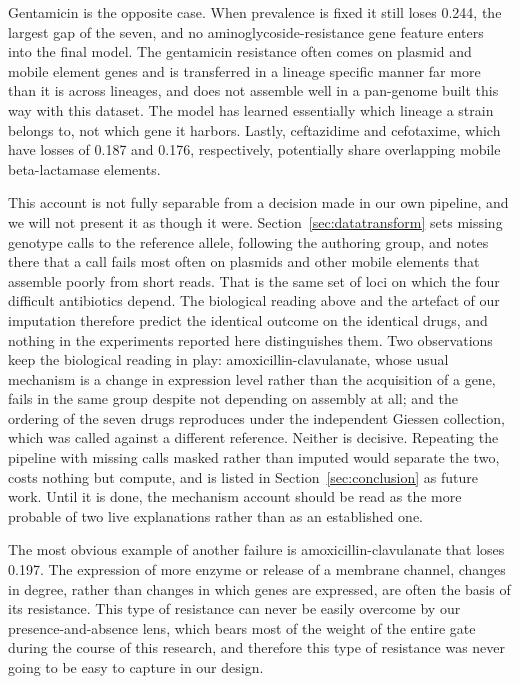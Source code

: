 \documentclass[journal]{IEEEtran}
\begin{document}
Gentamicin is the opposite case. When prevalence is fixed it still loses 0.244, the
largest gap of the seven, and no aminoglycoside-resistance gene feature enters into
the final model. The gentamicin resistance often comes on plasmid and mobile element
genes and is transferred in a lineage specific manner far more than it is across
lineages, and does not assemble well in a pan-genome built this way with this dataset.
The model has learned essentially which lineage a strain belongs to, not which gene it
harbors. Lastly, ceftazidime and cefotaxime, which have losses of 0.187 and 0.176,
respectively, potentially share overlapping mobile beta-lactamase elements.

This account is not fully separable from a decision made in our own pipeline, and we
will not present it as though it were. Section~\ref{sec:datatransform} sets missing
genotype calls to the reference allele, following the authoring group, and notes there
that a call fails most often on plasmids and other mobile elements that assemble poorly
from short reads. That is the same set of loci on which the four difficult antibiotics
depend. The biological reading above and the artefact of our imputation therefore
predict the identical outcome on the identical drugs, and nothing in the experiments
reported here distinguishes them. Two observations keep the biological reading in play:
amoxicillin-clavulanate, whose usual mechanism is a change in expression level rather
than the acquisition of a gene, fails in the same group despite not depending on
assembly at all; and the ordering of the seven drugs reproduces under the independent
Giessen collection, which was called against a different reference. Neither is decisive.
Repeating the pipeline with missing calls masked rather than imputed would separate the
two, costs nothing but compute, and is listed in Section~\ref{sec:conclusion} as
future work. Until it is done, the mechanism account should be read as the more probable
of two live explanations rather than as an established one.

The most obvious example of another failure is amoxicillin-clavulanate that loses
0.197. The expression of more enzyme or release of a membrane channel, changes in
degree, rather than changes in which genes are expressed, are often the basis of its
resistance. This type of resistance can never be easily overcome by our
presence-and-absence lens, which bears most of the weight of the entire gate during
the course of this research, and therefore this type of resistance was never going to
be easy to capture in our design.
\end{document}
